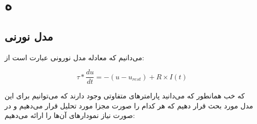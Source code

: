 \documentclass[12pt]{extreport}
\theoremstyle{definition}
\begin{document}
\section*{ه}

\subsection*{مدل نورنی }

می‌دانیم که معادله مدل نورونی  عبارت است از:

$$ \tau*\frac{du}{dt} = -(u - u_{rest}) + R \times I(t) $$ 

که خب همانطور که می‌دانید پارامتر‌های متفاوتی وجود دارند که می‌توانیم برای این مدل مورد بحث قرار دهیم که هر کدام را صورت مجزا مورد تحلیل قرار می‌دهیم و در صورت نیاز نمودارهای آن‌ها را ارائه می‌دهیم:
\end{document}
